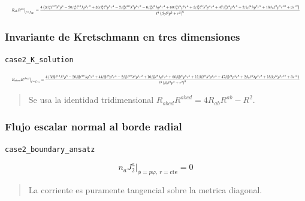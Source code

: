 \documentclass[11pt,a4paper]{article}
\begin{document}
\[
\resizebox{\textwidth}{!}{$\displaystyle R_{ab}R^{ab}\big|_{f=f_{(2)}} = \frac{4 \left(3 \beta_{0}^{4} \ell^{12} \lambda^{2} p^{8} - 20 \beta_{0}^{4} \ell^{10} \lambda p^{8} r^{2} + 36 \beta_{0}^{4} \ell^{8} p^{8} r^{4} - 2 \beta_{0}^{3} \ell^{10} \lambda^{2} p^{6} r^{2} - 6 \beta_{0}^{3} \ell^{8} \lambda p^{6} r^{4} + 60 \beta_{0}^{3} \ell^{6} p^{6} r^{6} + 3 \beta_{0}^{2} \ell^{8} \lambda^{2} p^{4} r^{4} + 47 \beta_{0}^{2} \ell^{4} p^{4} r^{8} + 2 \beta_{0} \ell^{4} \lambda p^{2} r^{8} + 18 \beta_{0} \ell^{2} p^{2} r^{10} + 3 r^{12}\right)}{\ell^{4} \left(\beta_{0} \ell^{2} p^{2} + r^{2}\right)^{6}}$}
\]

\subsubsection{Invariante de Kretschmann en tres dimensiones}

\noindent\texttt{case2\_K\_solution}\par\nopagebreak[4]

\[
\resizebox{\textwidth}{!}{$\displaystyle R_{abcd}R^{abcd}\big|_{f=f_{(2)}} = \frac{4 \left(3 \beta_{0}^{4} \ell^{12} \lambda^{2} p^{8} - 20 \beta_{0}^{4} \ell^{10} \lambda p^{8} r^{2} + 44 \beta_{0}^{4} \ell^{8} p^{8} r^{4} - 2 \beta_{0}^{3} \ell^{10} \lambda^{2} p^{6} r^{2} + 10 \beta_{0}^{3} \ell^{8} \lambda p^{6} r^{4} + 60 \beta_{0}^{3} \ell^{6} p^{6} r^{6} + 11 \beta_{0}^{2} \ell^{8} \lambda^{2} p^{4} r^{4} + 47 \beta_{0}^{2} \ell^{4} p^{4} r^{8} + 2 \beta_{0} \ell^{4} \lambda p^{2} r^{8} + 18 \beta_{0} \ell^{2} p^{2} r^{10} + 3 r^{12}\right)}{\ell^{4} \left(\beta_{0} \ell^{2} p^{2} + r^{2}\right)^{6}}$}
\]

\begin{quote}\small Se usa la identidad tridimensional \(R_{abcd}R^{abcd}=4R_{ab}R^{ab}-R^2\).\end{quote}

\subsubsection{Flujo escalar normal al borde radial}

\noindent\texttt{case2\_boundary\_ansatz}\par\nopagebreak[4]

\[
n_aJ_2^a\big|_{\phi=p\varphi,\,r=\mathrm{cte}} = 0
\]

\begin{quote}\small La corriente es puramente tangencial sobre la metrica diagonal.\end{quote}
\end{document}
